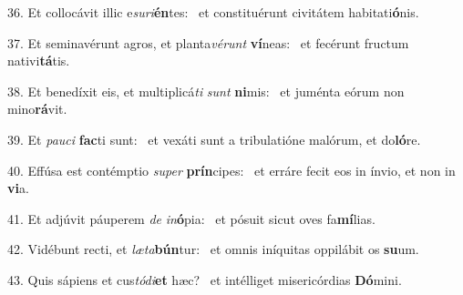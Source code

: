 36. Et collocávit illic e\textit{su}\textit{ri}\textbf{én}tes: \ast\  et constituérunt civitátem habitati\textbf{ó}nis.\

37. Et seminavérunt agros, et planta\textit{vé}\textit{runt} \textbf{ví}neas: \ast\  et fecérunt fructum nativi\textbf{tá}tis.\

38. Et benedíxit eis, et multiplicá\textit{ti} \textit{sunt} \textbf{ni}mis: \ast\  et juménta eórum non mino\textbf{rá}vit.\

39. Et \textit{pau}\textit{ci} \textbf{fac}ti sunt: \ast\  et vexáti sunt a tribulatióne malórum, et do\textbf{ló}re.\

40. Effúsa est contémptio \textit{su}\textit{per} \textbf{prín}cipes: \ast\  et erráre fecit eos in ínvio, et non in \textbf{vi}a.\

41. Et adjúvit páuperem \textit{de} \textit{in}\textbf{ó}pia: \ast\  et pósuit sicut oves fa\textbf{mí}lias.\

42. Vidébunt recti, et \textit{læ}\textit{ta}\textbf{bún}tur: \ast\  et omnis iníquitas oppilábit os \textbf{su}um.\

43. Quis sápiens et cus\textit{tó}\textit{di}\textbf{et} hæc? \ast\  et intélliget misericórdias \textbf{Dó}mini.\

